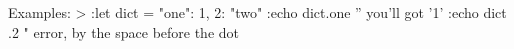 Examples: >
	:let dict = {"one": 1, 2: "two"}
	:echo dict.one    ” you'll got '1'
	:echo dict .2     " error, by the space before the dot
